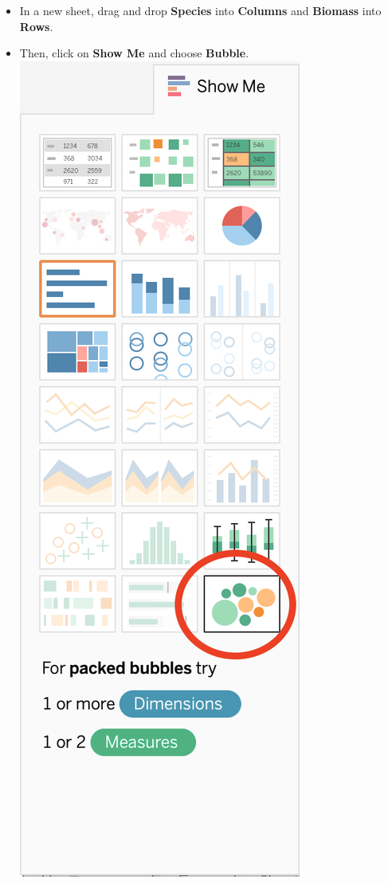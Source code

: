 \documentclass[
]{book}
\providecommand{\tightlist}{%
  \setlength{\itemsep}{0pt}\setlength{\parskip}{0pt}}
\begin{document}
\begin{enumerate}
  \begin{itemize}
  \tightlist
  \item
    In a new sheet, drag and drop \textbf{Species} into \textbf{Columns} and \textbf{Biomass} into \textbf{Rows}.
  \item
    Then, click on \textbf{Show Me} and choose \textbf{Bubble}.
    \includegraphics{images/M3S2_show-me-bubble-plot.png}

\end{itemize}
\end{enumerate}
\end{document}

